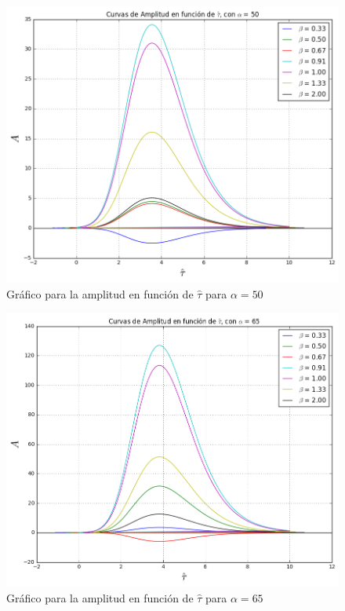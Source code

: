\documentclass[12pt, notitlepage]{article}
\begin{document}
\begin{figure}[H]
\centering
\includegraphics[scale = 0.6]{alfa50.png}
\caption{Gráfico para la amplitud en función de $\hat{\tau}$ para $\alpha = 50$}
\end{figure}

\begin{figure}[H]
\centering
\includegraphics[scale = 0.55]{alfa65.png}
\caption{Gráfico para la amplitud en función de $\hat{\tau}$ para $\alpha = 65$}
\end{figure}
\end{document}
